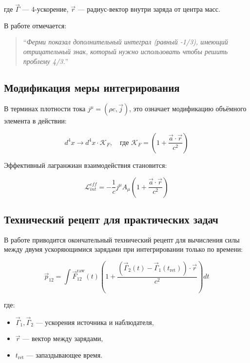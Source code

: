 \documentclass[12pt, a4paper]{article}
\begin{document}
где $\vec{\Gamma}$ --- 4-ускорение, $\vec{r}$ --- радиус-вектор внутри заряда от центра масс.

В работе \cite{FermiSolution} отмечается:

\begin{quote}
``\textit{Ферми показал дополнительный интеграл (равный -1/3), имеющий отрицательный знак, который нужно использовать чтобы решить проблему 4/3.}''
\end{quote}

\subsection{Модификация меры интегрирования}

В терминах плотности тока $j^\mu = (\rho c, \vec{j})$, это означает модификацию объёмного элемента в действии:

\begin{equation}
d^4x \longrightarrow d^4x \cdot \mathcal{K}_F, \quad \text{где } \mathcal{K}_F = \left( 1 + \frac{\vec{a} \cdot \vec{r}}{c^2} \right)
\label{eq:measure_modification}
\end{equation}

Эффективный лагранжиан взаимодействия становится:

\begin{equation}
\mathcal{L}_{int}^{eff} = -\frac{1}{c} j^\mu A_\mu \left( 1 + \frac{\vec{a} \cdot \vec{r}}{c^2} \right)
\label{eq:lagrangian_eff}
\end{equation}

\subsection{Технический рецепт для практических задач}

В работе \cite{FermiSolution} приводится окончательный технический рецепт для вычисления силы между двумя ускоряющимися зарядами при интегрировании только по времени:

\begin{equation}
\vec{p}_{12} = \int \vec{F}_{12}^{\text{raw}}(t) \left( 1 + \frac{(\vec{\Gamma}_2(t) - \vec{\Gamma}_1(t_{\text{ret}})) \cdot \vec{r}}{c^2} \right) dt
\label{eq:fermi_technical}
\end{equation}

где:
\begin{itemize}
    \item $\vec{\Gamma}_1, \vec{\Gamma}_2$ --- ускорения источника и наблюдателя,
    \item $\vec{r}$ --- вектор между зарядами,
    \item $t_{\text{ret}}$ --- запаздывающее время.
\end{itemize}
\end{document}
